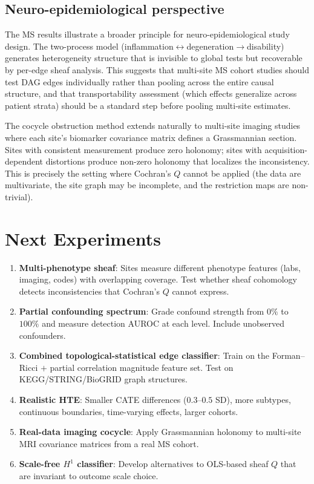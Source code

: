 \documentclass[11pt]{article}
\begin{document}
\subsection{Neuro-epidemiological perspective}

The MS results illustrate a broader principle for neuro-epidemiological study design.
The two-process model (inflammation$\leftrightarrow$degeneration$\to$disability) generates heterogeneity structure that is invisible to global tests but recoverable by per-edge sheaf analysis.
This suggests that multi-site MS cohort studies should test DAG edges individually rather than pooling across the entire causal structure, and that transportability assessment (which effects generalize across patient strata) should be a standard step before pooling multi-site estimates.

The cocycle obstruction method extends naturally to multi-site imaging studies where each site's biomarker covariance matrix defines a Grassmannian section.
Sites with consistent measurement produce zero holonomy; sites with acquisition-dependent distortions produce non-zero holonomy that localizes the inconsistency.
This is precisely the setting where Cochran's $Q$ cannot be applied (the data are multivariate, the site graph may be incomplete, and the restriction maps are non-trivial).

\section{Next Experiments}
\label{sec:next}

\begin{enumerate}[nosep]
    \item \textbf{Multi-phenotype sheaf}: Sites measure different phenotype features (labs, imaging, codes) with overlapping coverage. Test whether sheaf cohomology detects inconsistencies that Cochran's $Q$ cannot express.

    \item \textbf{Partial confounding spectrum}: Grade confound strength from $0\%$ to $100\%$ and measure detection AUROC at each level. Include unobserved confounders.

    \item \textbf{Combined topological-statistical edge classifier}: Train on the Forman--Ricci $+$ partial correlation magnitude feature set. Test on KEGG/STRING/BioGRID graph structures.

    \item \textbf{Realistic HTE}: Smaller CATE differences ($0.3$--$0.5$ SD), more subtypes, continuous boundaries, time-varying effects, larger cohorts.

    \item \textbf{Real-data imaging cocycle}: Apply Grassmannian holonomy to multi-site MRI covariance matrices from a real MS cohort.

    \item \textbf{Scale-free $H^1$ classifier}: Develop alternatives to OLS-based sheaf $Q$ that are invariant to outcome scale choice.
\end{enumerate}
\end{document}
